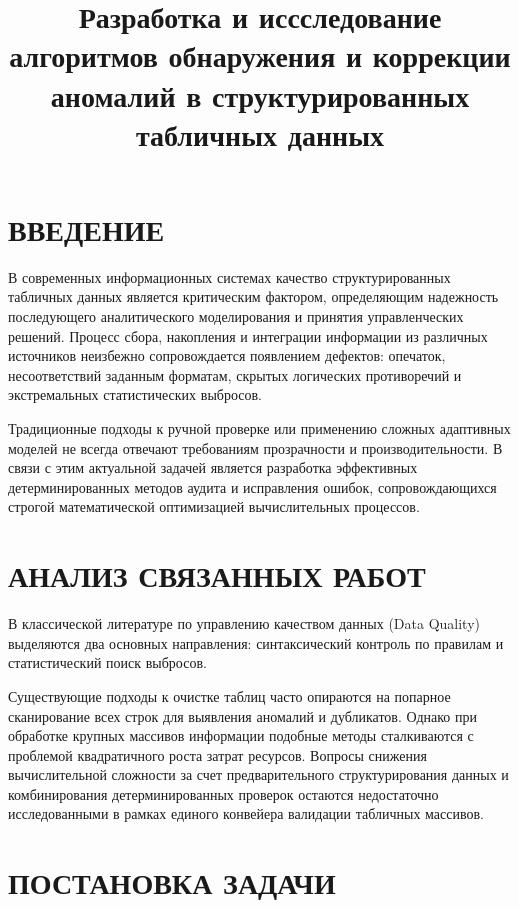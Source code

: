 \documentclass{misisarticle}
\title{Разработка и иссследование алгоритмов обнаружения и коррекции аномалий в структурированных табличных данных}
\begin{document}
\maketitle

\section{ВВЕДЕНИЕ}

В современных информационных системах качество структурированных табличных данных является критическим фактором, определяющим надежность последующего аналитического моделирования и принятия управленческих решений. Процесс сбора, накопления и интеграции информации из различных источников неизбежно сопровождается появлением дефектов: опечаток, несоответствий заданным форматам, скрытых логических противоречий и экстремальных статистических выбросов. 

Традиционные подходы к ручной проверке или применению сложных адаптивных моделей не всегда отвечают требованиям прозрачности и производительности. В связи с этим актуальной задачей является разработка эффективных детерминированных методов аудита и исправления ошибок, сопровождающихся строгой математической оптимизацией вычислительных процессов.

\section{АНАЛИЗ СВЯЗАННЫХ РАБОТ}

В классической литературе по управлению качеством данных (Data Quality) выделяются два основных направления: синтаксический контроль по правилам и статистический поиск выбросов. 

Существующие подходы к очистке таблиц часто опираются на попарное сканирование всех строк для выявления аномалий и дубликатов. Однако при обработке крупных массивов информации подобные методы сталкиваются с проблемой квадратичного роста затрат ресурсов. Вопросы снижения вычислительной сложности за счет предварительного структурирования данных и комбинирования детерминированных проверок остаются недостаточно исследованными в рамках единого конвейера валидации табличных массивов.

\section{ПОСТАНОВКА ЗАДАЧИ}
\end{document}
